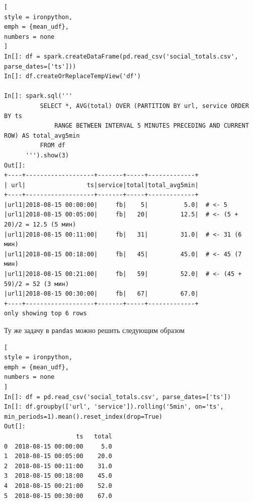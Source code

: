 \documentclass[%
	11pt,
	a4paper,
	utf8,
		]{article}
\begin{document}
\begin{lstlisting}[
style = ironpython,
emph = {mean_udf},
numbers = none
]
In[]: df = spark.createDataFrame(pd.read_csv('social_totals.csv', parse_dates=['ts']))
In[]: df.createOrReplaceTempView('df')

In[]: spark.sql('''
          SELECT *, AVG(total) OVER (PARTITION BY url, service ORDER BY ts
              RANGE BETWEEN INTERVAL 5 MINUTES PRECEDING AND CURRENT ROW) AS total_avg5min
          FROM df
      ''').show(3)
Out[]:
+----+-------------------+-------+-----+-------------+
| url|                 ts|service|total|total_avg5min|
+----+-------------------+-------+-----+-------------+
|url1|2018-08-15 00:00:00|     fb|    5|          5.0|  # <- 5
|url1|2018-08-15 00:05:00|     fb|   20|         12.5|  # <- (5 + 20)/2 = 12.5 (5 мин)
|url1|2018-08-15 00:11:00|     fb|   31|         31.0|  # <- 31 (6 мин)
|url1|2018-08-15 00:18:00|     fb|   45|         45.0|  # <- 45 (7 мин)
|url1|2018-08-15 00:21:00|     fb|   59|         52.0|  # <- (45 + 59)/2 = 52 (3 мин)
|url1|2018-08-15 00:30:00|     fb|   67|         67.0|
+----+-------------------+-------+-----+-------------+
only showing top 6 rows
\end{lstlisting}

Ту же задачу в \texttt{pandas} можно решить следующим образом

\begin{lstlisting}[
style = ironpython,
emph = {mean_udf},
numbers = none
]
In[]: df = pd.read_csv('social_totals.csv', parse_dates=['ts'])
In[]: df.groupby(['url', 'service']).rolling('5min', on='ts', min_periods=1).mean().reset_index(drop=True)
Out[]:
                    ts   total
0  2018-08-15 00:00:00     5.0
1  2018-08-15 00:05:00    20.0
2  2018-08-15 00:11:00    31.0
3  2018-08-15 00:18:00    45.0
4  2018-08-15 00:21:00    52.0
5  2018-08-15 00:30:00    67.0
\end{lstlisting}
\end{document}
